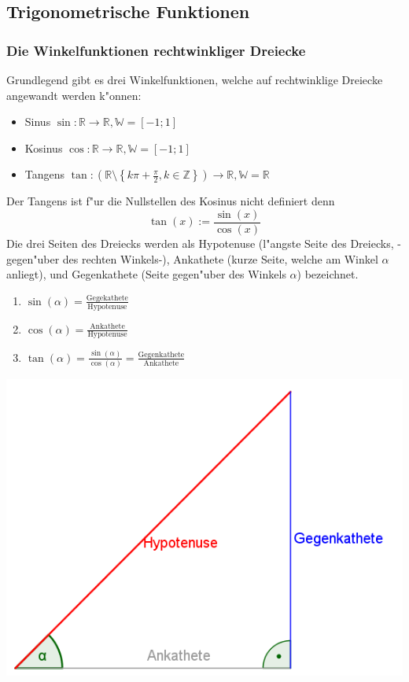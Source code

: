 \subsection{Trigonometrische Funktionen}
\subsubsection{Die Winkelfunktionen rechtwinkliger Dreiecke}
Grundlegend gibt es drei Winkelfunktionen, welche auf rechtwinklige Dreiecke angewandt werden k"onnen:
\begin{itemize}
\item Sinus $\sin : \mathbb{R} \to \mathbb{R}, \mathbb{W} = \left[-1;1 \right]$
\item Kosinus $\cos : \mathbb{R} \to \mathbb{R}, \mathbb{W} = \left[ -1;1 \right]$
\item Tangens $\tan : \left( \mathbb{R} \setminus \left\{ k \pi + \frac{\pi}{2}, k \in \mathbb{Z} \right\} \right) \to \mathbb{R}, \mathbb{W} = \mathbb{R}$
\end{itemize}
Der Tangens ist f"ur die Nullstellen des Kosinus nicht definiert denn
\begin{equation*}
\tan(x) := \frac{\sin(x)}{\cos(x)}
\end{equation*}
Die drei Seiten des Dreiecks werden als Hypotenuse (l"angste Seite des Dreiecks, -gegen"uber des rechten Winkels-), Ankathete (kurze Seite, welche am Winkel $\alpha$ anliegt), und Gegenkathete (Seite gegen"uber des Winkels $\alpha$) bezeichnet.
\begin{minipage}{0.45\textwidth}
\hfill
\begin{enumerate}
\item $\sin(\alpha)=\frac{\text{Gegekathete}}{\text{Hypotenuse}}$
\item $\cos(\alpha)=\frac{\text{Ankathete}}{\text{Hypotenuse}}$
\item $\tan(\alpha)=\frac{\sin(\alpha)}{\cos(\alpha)}= \frac{\text{Gegenkathete}}{\text{Ankathete}}$
\end{enumerate}
\end{minipage}
\begin{minipage}{0.45\textwidth}
\includegraphics[width=1.0\textwidth]{pictures/TrigonDreieck}
\end{minipage}


